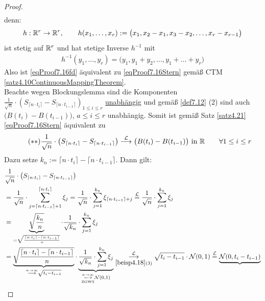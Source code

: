 \begin{proof}
\begin{align}
	\end{align}
	denn:
	\begin{align*}
		h:\mathbb{R}^r\to\mathbb{R}^r,\qquad h(x_1,\ldots,x_r):=\big(x_1,x_2-x_1,x_3-x_2,\ldots,x_r-x_{r-1}\big)
	\end{align*}
	ist stetig auf $\mathbb{R}^r$ und hat stetige Inverse $h^{-1}$ mit 
	\begin{align*}
		h^{-1}(y_1,\ldots,y_r)=\big(y_1,y_1+y_2,\ldots,y_1+\ldots+y_r\big)
	\end{align*}
	Also ist \eqref{eqProof7.16fd} äquivalent zu \eqref{eqProof7.16Stern} gemäß CTM \ref{satz4.10ContinuousMappingTheorem}.\\
	Beachte wegen Blockungslemma sind die Komponenten $\frac{1}{\sqrt{n}}\cdot\left(S_{\lceil n\cdot t_i\rceil}-S_{\lceil n\cdot t_{i-1}\rceil}\right)_{1\leq i\leq r}$ \underline{unabhängig} und gemäß \ref{def7.12} (2) sind auch $\big(B(t_i)-B(t_{i-1})\big)$, $a\leq i\leq r$ unabhängig. 
	Somit ist gemäß Satz \ref{satz4.21} \eqref{eqProof7.16Stern} äquivalent zu 
	\begin{align}\label{eqProof7.16SternStern}\tag{$\ast\ast$}
		\frac{1}{\sqrt{n}}\cdot\left(S_{\lceil n\cdot t_i\rceil}-S_{\lceil n\cdot t_{i-1}\rceil}\right)
		\stackrel{\mathcal{L}}{\longrightarrow}
		\big(B(t_i)-B(t_{i-1})\big)\text{ in }\mathbb{R}\qquad\forall 1\leq i\leq r
	\end{align}
	Dazu setze $k_n:=\lceil n\cdot t_i\rceil-\lceil n\cdot t_{i-1}\rceil$. Dann gilt:
	\begin{align*}
		&\frac{1}{\sqrt{n}}\cdot\left(S_{\lceil n\cdot t_i\rceil}-S_{\lceil n\cdot t_{i-1}\rceil}\right)\\
		&=\frac{1}{\sqrt{n}}\cdot\sum\limits_{j=\lceil n\cdot t_{i-1}\rceil+1}^{\lceil n\cdot t_i\rceil}\xi_j
		=\frac{1}{\sqrt{n}}\cdot\sum\limits_{j=1}^{k_n}\xi_{\lceil n\cdot t_{i-1}\rceil+j}
		\overset{\mathcal{L}}{=}
		\frac{1}{\sqrt{n}}\cdot\sum\limits_{j=1}^{k_n}\xi_j\\
		&=\underbrace{\sqrt{\frac{k_n}{n}}}_{=\sqrt{\frac{\lceil n\cdot t_i\rceil-\lceil n\cdot t_{i-1}\rceil}{n}}}\cdot\frac{1}{\sqrt{k_n}}\cdot\sum\limits_{j=1}^{k_n}\xi_j\\
		&=\underbrace{\sqrt{\frac{\lceil n\cdot t_i\rceil-\lceil n\cdot t_{i-1}\rceil}{n}}}_{\stackrel{n\to\infty}{\longrightarrow}\sqrt{t_i-t_{i-1}}}\cdot\underbrace{\frac{1}{\sqrt{k_n}}\cdot\sum\limits_{j=1}^{k_n}\xi_j}_{\underset{\text{ZGWS}}{\overset{n\to\infty}{\longrightarrow}}\mathcal{N}(0,1)}\underset{\ref{beisp4.18}(3)}{\overset{\mathcal{L}}{\longrightarrow}}\sqrt{t_i-t_{i-1}}\cdot\mathcal{N}(0,1)
		\overset{\mathcal{L}}{=}\underbrace{\mathcal{N}(0,t_i-t_{i-1})}_{
}
\end{align*}
\end{proof}
